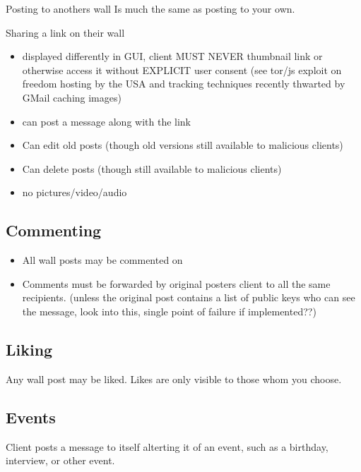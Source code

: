         Posting to anothers wall Is much the same as posting to your own.
        
        Sharing a link on their wall
            \begin{itemize}
            \item displayed differently in GUI, client MUST NEVER thumbnail link or
              otherwise access it without EXPLICIT user consent (see tor/js
              exploit on freedom hosting by the USA and tracking techniques
              recently thwarted by GMail caching images)
            \item can post a message along with the link
            \end{itemize}
        
        \begin{itemize}
        \item Can edit old posts (though old versions still available to malicious clients)
        \item Can delete posts (though still available to malicious clients)
        \item no pictures/video/audio
        \end{itemize}
        
    \subsection{Commenting}
        \begin{itemize}
        \item All wall posts may be commented on
        \item Comments must be forwarded by original posters client to all the same
          recipients.
          (unless the original post contains a list of public keys who can see
          the message, look into this, single point of failure if implemented??)
        \end{itemize}
    
    \subsection{Liking}
        Any wall post may be liked. Likes are only visible to those whom you
          choose.
    
    \subsection{Events}
        Client posts a message to itself alterting it of an event, such as a
        birthday, interview, or other event.
    
